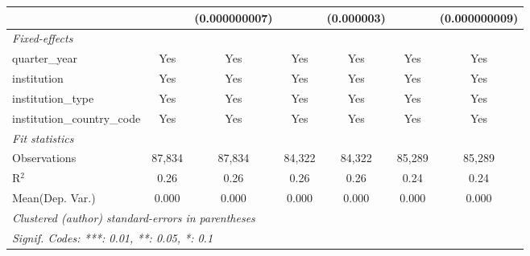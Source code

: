 \begin{tabular}{lcccccc}
                                      &              & (0.000000007) &              & (0.000003)     &              & (0.000000009)\\   
   \midrule
   \emph{Fixed-effects}\\
   quarter\_year                      & Yes          & Yes           & Yes          & Yes            & Yes          & Yes\\  
   institution                        & Yes          & Yes           & Yes          & Yes            & Yes          & Yes\\  
   institution\_type                  & Yes          & Yes           & Yes          & Yes            & Yes          & Yes\\  
   institution\_country\_code         & Yes          & Yes           & Yes          & Yes            & Yes          & Yes\\  
   \midrule
   \emph{Fit statistics}\\
   Observations                       & 87,834       & 87,834        & 84,322       & 84,322         & 85,289       & 85,289\\  
   R$^2$                              & 0.26         & 0.26          & 0.26         & 0.26           & 0.24         & 0.24\\  
Mean(Dep. Var.) & 0.000 & 0.000 & 0.000 & 0.000 & 0.000 & 0.000 \\
   \midrule \midrule
   \multicolumn{7}{l}{\emph{Clustered (author) standard-errors in parentheses}}\\
   \multicolumn{7}{l}{\emph{Signif. Codes: ***: 0.01, **: 0.05, *: 0.1}}\\
\end{tabular}
\par\endgroup
